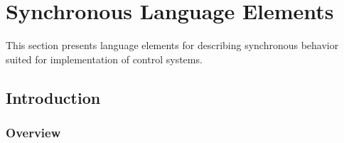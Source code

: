 \chapter{Synchronous Language Elements}\label{synchronous-language-elements}

This section presents language elements for describing synchronous
behavior suited for implementation of control systems.

\section{Introduction}\label{introduction2}

\subsection{Overview}\label{overview}

